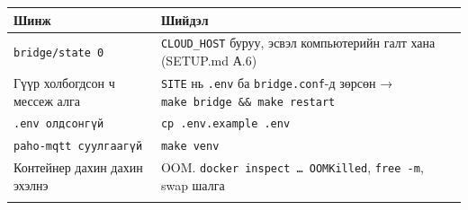 \begingroup\scriptsize\begin{longtable}[]{@{}ll@{}}
\toprule
\begin{minipage}[b]{0.47\columnwidth}\raggedright
Шинж\strut
\end{minipage} & \begin{minipage}[b]{0.47\columnwidth}\raggedright
Шийдэл\strut
\end{minipage}\tabularnewline
\midrule
\endhead
\begin{minipage}[t]{0.47\columnwidth}\raggedright
\texttt{bridge/state\ 0}\strut
\end{minipage} & \begin{minipage}[t]{0.47\columnwidth}\raggedright
\texttt{CLOUD\_HOST} буруу, эсвэл компьютерийн галт хана (SETUP.md А.6)\strut
\end{minipage}\tabularnewline
\begin{minipage}[t]{0.47\columnwidth}\raggedright
Гүүр холбогдсон ч мессеж алга\strut
\end{minipage} & \begin{minipage}[t]{0.47\columnwidth}\raggedright
\texttt{SITE} нь \texttt{.env} ба \texttt{bridge.conf}-д зөрсөн → \texttt{make\ bridge\ \&\allowbreak{}\&\allowbreak{}\ make\ restart}\strut
\end{minipage}\tabularnewline
\begin{minipage}[t]{0.47\columnwidth}\raggedright
\texttt{.env\ олдсонгүй}\strut
\end{minipage} & \begin{minipage}[t]{0.47\columnwidth}\raggedright
\texttt{cp\ .\allowbreak{}env.\allowbreak{}example\ .\allowbreak{}env}\strut
\end{minipage}\tabularnewline
\begin{minipage}[t]{0.47\columnwidth}\raggedright
\texttt{paho-mqtt\ суулгаагүй}\strut
\end{minipage} & \begin{minipage}[t]{0.47\columnwidth}\raggedright
\texttt{make\ venv}\strut
\end{minipage}\tabularnewline
\begin{minipage}[t]{0.47\columnwidth}\raggedright
Контейнер дахин дахин эхэлнэ\strut
\end{minipage} & \begin{minipage}[t]{0.47\columnwidth}\raggedright
OOM. \texttt{docker\ inspect\ \ldots{}\ OOMKilled}, \texttt{free\ -m}, swap шалга\strut
\end{minipage}\tabularnewline
\begin{minipage}[t]{0.47\columnwidth}\raggedright

\end{minipage}
\end{longtable}
